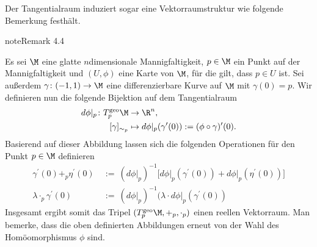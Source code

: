 \documentclass[letterpaper,10pt,german]{jupyterBook}
\begin{document}
\sphinxAtStartPar
Der Tangentialraum induziert sogar eine Vektorraumstruktur wie folgende Bemerkung festhält.
\label{manifolds/tangential:remark-6}
\begin{sphinxadmonition}{note}{Remark 4.4}



\sphinxAtStartPar
Es sei \(\M\) eine glatte \(n\)\sphinxhyphen{}dimensionale Mannigfaltigkeit, \(p\in\M\) ein Punkt auf der Mannigfaltigkeit und \((U,\phi)\) eine Karte von \(\M\), für die gilt, dass \(p\in U\) ist.
Sei außerdem \(\gamma \colon (-1,1) \rightarrow \M\) eine differenzierbare Kurve auf \(\M\) mit \(\gamma(0) = p\).
Wir definieren nun die folgende Bijektion auf dem Tangentialraum
\begin{equation*}
\begin{split}d\phi\rvert_p \colon T^{\text{geo}}_p\M &\rightarrow \R^n,\\
[\gamma]_{\sim_p} &\mapsto d\phi\rvert_p (\gamma^\prime(0)) := (\phi \circ \gamma)^\prime (0).\end{split}
\end{equation*}
\sphinxAtStartPar
Basierend auf dieser Abbildung lassen sich die folgenden Operationen für den Punkt \(p \in \M\) definieren
\begin{equation*}
\begin{split}\gamma^\prime(0) +_{p} \eta^\prime(0) \ &:= \
(d\phi\rvert_p)^{-1}\big[d\phi\rvert_p(\gamma^\prime(0)) + d\phi\rvert_p(\eta^\prime(0))\big]\\
\lambda \cdot_p \gamma^\prime(0) \ &:= \ (d\phi\rvert_p)^{-1} (\lambda \cdot d\phi\rvert_p(\gamma^\prime(0))\end{split}
\end{equation*}
\sphinxAtStartPar
Insgesamt ergibt somit das Tripel \((T_p^{\text{geo}}\M, +_p, \cdot_p)\) einen reellen Vektorraum.
Man bemerke, dass die oben definierten Abbildungen erneut \sphinxstylestrong{unabhängig} von der Wahl des Homöomorphismus \(\phi\) sind.
\end{sphinxadmonition}
\end{document}
